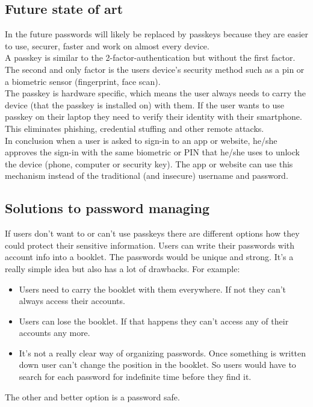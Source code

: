 \documentclass[conference]{IEEEtran}
\begin{document}
\subsection{Future state of art}
In the future passwords will likely be replaced by passkeys because they are easier to use, securer, faster and work on almost every device.\\
A passkey is similar to the 2-factor-authentication but without the first factor. The second and only factor is the users device's security method such as a pin or a biometric sensor (fingerprint, face scan). \\
The passkey is hardware specific, which means the user always needs to carry the device (that the passkey is installed on) with them. If the user wants to use passkey on their laptop they need to verify their identity with their smartphone. This eliminates phishing, credential stuffing and other remote attacks. \\
In conclusion when a user is asked to sign-in to an app or website, he/she approves the sign-in with the same biometric or PIN that he/she uses to unlock the device (phone, computer or security key). The app or website can use this mechanism instead of the traditional (and insecure) username and password. \cite{b5}

\subsection{Solutions to password managing}
If users don't want to or can't use passkeys there are different options how they could protect their sensitive information. Users can write their passwords with account info into a booklet. The passwords would be unique and strong. It's a really simple idea but also has a lot of drawbacks. 
For example:
\begin{itemize}
\item Users need to carry the booklet with them everywhere. If not they can't always access their accounts.
\item Users can lose the booklet. If that happens they can't access any of their accounts any more.
\item It's not a really clear way of organizing passwords. Once something is written down user can't change the position in the booklet. So users would have to search for each password for indefinite time before they find it.
\end{itemize}
The other and better option is a password safe.  
\end{document}
